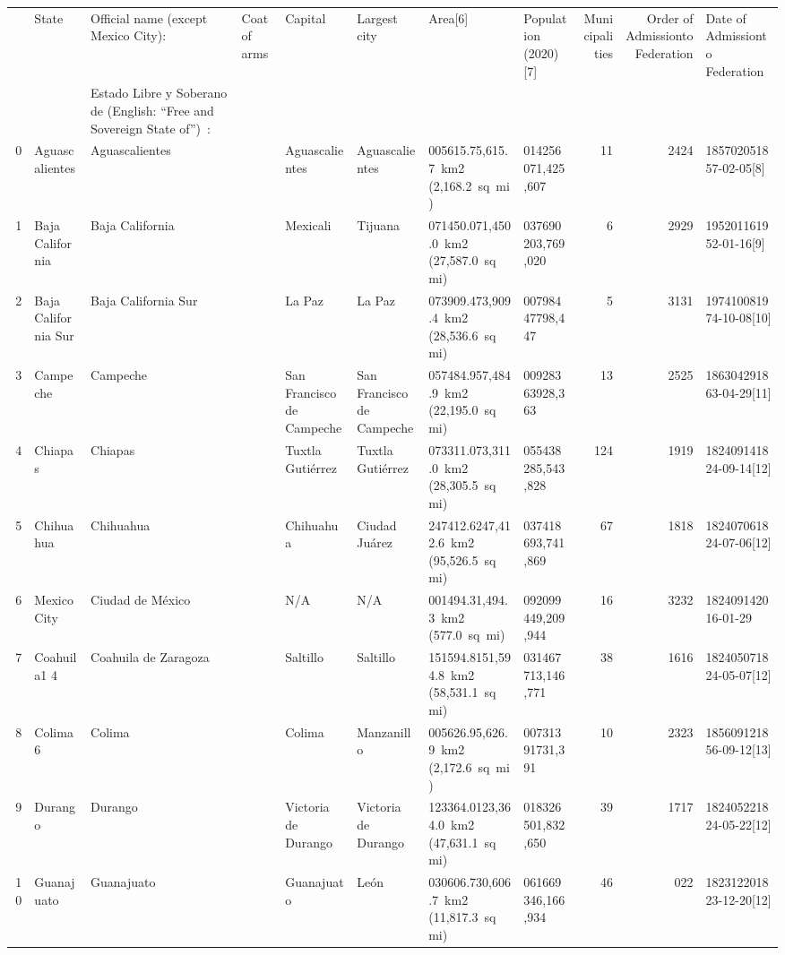 \documentclass[11pt]{article}
\begin{document}
\begin{center}
\begin{tabular}{rlllllllrrl}
 & State & Official name (except Mexico City): & Coat of arms & Capital & Largest city & Area[6] & Population (2020)[7] & Municipalities & Order of Admissionto Federation & Date of Admissionto Federation\\
 &  & Estado Libre y Soberano de (English: ``Free and Sovereign State of'') : &  &  &  &  &  &  &  & \\
\hline
0 & Aguascalientes & Aguascalientes &  & Aguascalientes & Aguascalientes & 005615.75,615.7 km2 (2,168.2 sq mi) & 014256071,425,607 & 11 & 2424 & 185702051857-02-05[8]\\
1 & Baja California & Baja California &  & Mexicali & Tijuana & 071450.071,450.0 km2 (27,587.0 sq mi) & 037690203,769,020 & 6 & 2929 & 195201161952-01-16[9]\\
2 & Baja California Sur & Baja California Sur &  & La Paz & La Paz & 073909.473,909.4 km2 (28,536.6 sq mi) & 00798447798,447 & 5 & 3131 & 197410081974-10-08[10]\\
3 & Campeche & Campeche &  & San Francisco de Campeche & San Francisco de Campeche & 057484.957,484.9 km2 (22,195.0 sq mi) & 00928363928,363 & 13 & 2525 & 186304291863-04-29[11]\\
4 & Chiapas & Chiapas &  & Tuxtla Gutiérrez & Tuxtla Gutiérrez & 073311.073,311.0 km2 (28,305.5 sq mi) & 055438285,543,828 & 124 & 1919 & 182409141824-09-14[12]\\
5 & Chihuahua & Chihuahua &  & Chihuahua & Ciudad Juárez & 247412.6247,412.6 km2 (95,526.5 sq mi) & 037418693,741,869 & 67 & 1818 & 182407061824-07-06[12]\\
6 & Mexico City & Ciudad de México &  & N/A & N/A & 001494.31,494.3 km2 (577.0 sq mi) & 092099449,209,944 & 16 & 3232 & 182409142016-01-29\\
7 & Coahuila1 4 & Coahuila de Zaragoza &  & Saltillo & Saltillo & 151594.8151,594.8 km2 (58,531.1 sq mi) & 031467713,146,771 & 38 & 1616 & 182405071824-05-07[12]\\
8 & Colima6 & Colima &  & Colima & Manzanillo & 005626.95,626.9 km2 (2,172.6 sq mi) & 00731391731,391 & 10 & 2323 & 185609121856-09-12[13]\\
9 & Durango & Durango &  & Victoria de Durango & Victoria de Durango & 123364.0123,364.0 km2 (47,631.1 sq mi) & 018326501,832,650 & 39 & 1717 & 182405221824-05-22[12]\\
10 & Guanajuato & Guanajuato &  & Guanajuato & León & 030606.730,606.7 km2 (11,817.3 sq mi) & 061669346,166,934 & 46 & 022 & 182312201823-12-20[12]\\

\end{tabular}
\end{center}
\end{document}
